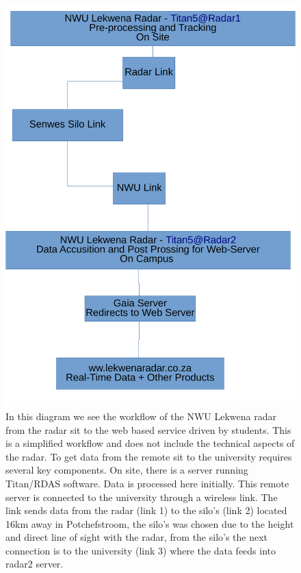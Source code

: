 \documentclass{wrcreport}
\begin{document}
\begin{figure}
\includegraphics[width=\textwidth]{radarworkflow.pdf}
\caption[NWU CRG Radar Workflow]{In this diagram we see the workflow
of the NWU Lekwena radar from the radar sit to the web based service
driven by students. This is a simplified workflow and does not include
the technical aspects of the radar. To get data from the remote sit to
the university requires several key components. On site, there is a
server running Titan/RDAS software. Data is processed here initially.
This remote server is connected to the university through a wireless
link. The link sends data from the radar (link 1) to the silo's (link
2) located 16km away in Potchefstroom, the silo's was chosen due to
the height and direct line of sight with the radar, from the silo's
the next connection is to the university (link 3) where the data feeds
into radar2 server.} 
\label{fig:workflow}
\end{figure}
\end{document}
